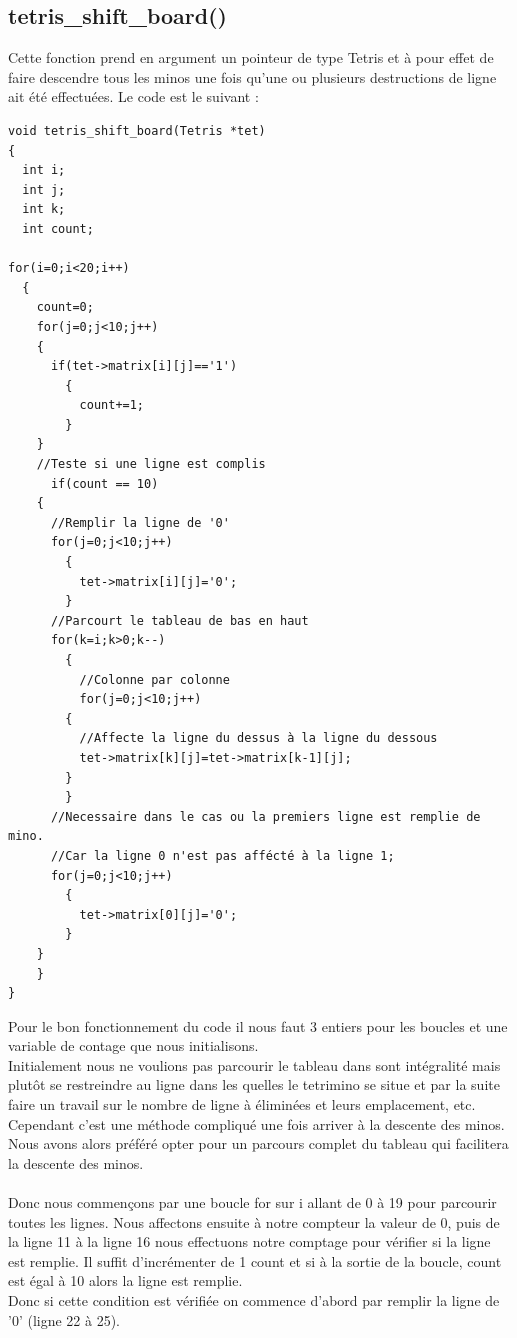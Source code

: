 \documentclass[a4paper,10p]{report}
\begin{document}
\subsection{tetris\_shift\_board()}
\label{tetris_shift_board}
Cette fonction prend en argument un pointeur de type Tetris et à pour effet de faire descendre tous les minos une fois qu'une ou plusieurs destructions de ligne ait été effectuées. Le code est le suivant :
\begin{lstlisting}
void tetris_shift_board(Tetris *tet)
{
  int i;
  int j;
  int k;
  int count;
 
for(i=0;i<20;i++)
  {
    count=0;
    for(j=0;j<10;j++)
	{
	  if(tet->matrix[i][j]=='1')
	    {
	      count+=1;
	    }
	}
    //Teste si une ligne est complis
      if(count == 10)
	{
	  //Remplir la ligne de '0'
	  for(j=0;j<10;j++)
	    {
	      tet->matrix[i][j]='0';
	    }
	  //Parcourt le tableau de bas en haut
	  for(k=i;k>0;k--)
	    {
	      //Colonne par colonne
	      for(j=0;j<10;j++)
		{
		  //Affecte la ligne du dessus à la ligne du dessous
		  tet->matrix[k][j]=tet->matrix[k-1][j];
		}
	    }
	  //Necessaire dans le cas ou la premiers ligne est remplie de mino.
	  //Car la ligne 0 n'est pas affécté à la ligne 1;
	  for(j=0;j<10;j++)
	    {
	      tet->matrix[0][j]='0';
	    }
	}
    }
}
\end{lstlisting}
Pour le bon fonctionnement du code il nous faut 3 entiers pour les boucles et une variable de contage que nous initialisons.
\\Initialement nous ne voulions pas parcourir le tableau dans sont intégralité mais plutôt se restreindre au ligne dans les quelles le tetrimino se situe et par la suite faire un travail sur le nombre de ligne à éliminées et leurs emplacement, etc. Cependant c'est une méthode compliqué une fois arriver à la descente des minos. Nous avons alors préféré opter pour un parcours complet du tableau qui facilitera la descente des minos.
\\\\
Donc nous commençons par une boucle for sur i allant de 0 à 19 pour parcourir toutes les lignes. Nous affectons ensuite à notre compteur la valeur de 0, puis de la ligne \textcolor{gris}{11} à la ligne \textcolor{gris}{16} nous effectuons notre comptage pour vérifier si la ligne est remplie. Il suffit d'incrémenter de 1 count et si à la sortie de la boucle, count est égal à 10 alors la ligne est remplie.
\\Donc si cette condition est vérifiée on commence d'abord par remplir la ligne de '0' (ligne \textcolor{gris}{22} à \textcolor{gris}{25}).
\end{document}

